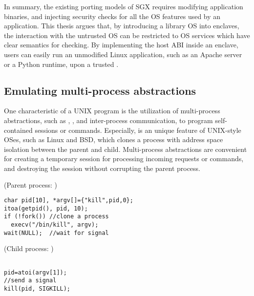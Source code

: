 In summary, the existing porting models of SGX requires modifying application binaries, and injecting security checks for all the OS features used by an application.
This thesis argues that, by introducing a library OS into enclaves,
the interaction with the untrusted OS can be restricted to OS services which have clear semantics for checking.
By implementing the host ABI inside an enclave,
users can easily run an unmodified Linux application, such as an Apache server or a Python runtime, upon a trusted \libos{}.



\subsection{Emulating multi-process abstractions}
\label{sec:intro:multiproc}


One characteristic of a UNIX program
is the utilization of multi-process abstractions,
such as , ,
and inter-process communication,
to program self-contained sessions or commands.
Especially,  is an unique feature of UNIX-style OSes, such as Linux and BSD,
which clones a process with address space isolation
between the parent and child.
Multi-process abstractions are convenient for creating a temporary session for processing incoming requests or commands, and destroying the session without corrupting the parent process.



\begin{figure*}
\begin{minipage}[t]{.65\textwidth}
(Parent process: )
\lstset{basicstyle=\ttfamily\footnotesize,fontadjust=true,breaklines=true}
\begin{lstlisting}
char pid[10], *argv[]={"kill",pid,0};
itoa(getpid(), pid, 10);
if (!fork()) //clone a process
  execv("/bin/kill", argv);
wait(NULL);  //wait for signal
\end{lstlisting}
\end{minipage}
\begin{minipage}[t]{.33\textwidth}
(Child process: )
\lstset{basicstyle=\ttfamily\footnotesize,fontadjust=true,breaklines=true}
\begin{lstlisting}

pid=atoi(argv[1]);
//send a signal
kill(pid, SIGKILL);

\end{lstlisting}
\end{minipage}
\caption{Sample code for Linux applications using process cloning and inter-process communication (IPC).}
\label{fig:overview:proc-example}
\end{figure*}

